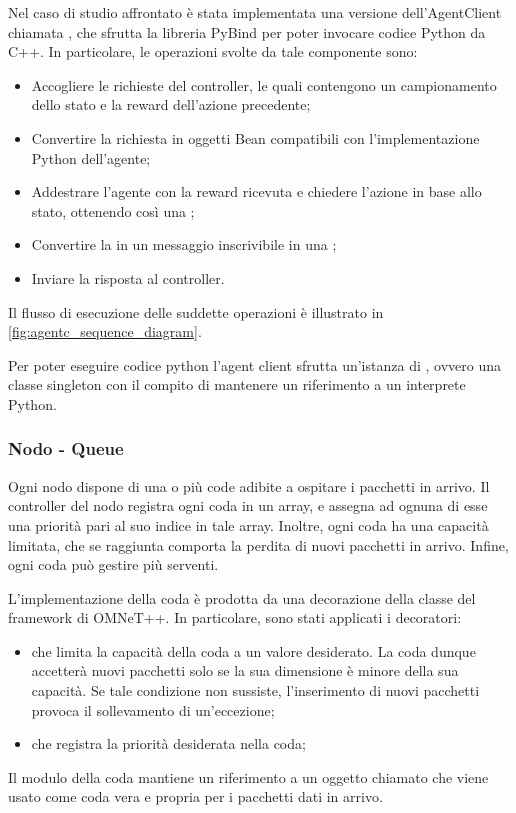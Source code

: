 \documentclass[conference]{IEEEtran}
\begin{document}
Nel caso di studio affrontato è stata implementata una versione dell'AgentClient chiamata
, che sfrutta la libreria PyBind per poter invocare codice
Python da C++. In particolare, le operazioni svolte da tale componente sono:
\begin{itemize}
    \item Accogliere le richieste del controller, le quali contengono un campionamento
    dello stato e la reward dell'azione precedente;
    \item Convertire la richiesta in oggetti Bean compatibili con l'implementazione Python
    dell'agente;
    \item Addestrare l'agente con la reward ricevuta e chiedere l'azione in base 
    allo stato, ottenendo così una ;
    \item Convertire la  in un messaggio inscrivibile 
    in una ;
    \item Inviare la risposta al controller.
\end{itemize}
Il flusso di esecuzione delle suddette operazioni è illustrato in \autoref{fig:agentc_sequence_diagram}.

Per poter eseguire codice python l'agent client sfrutta un'istanza di
, ovvero una classe singleton con il compito di mantenere un 
riferimento a un interprete Python.
 
\subsubsection{Nodo - Queue}
Ogni nodo dispone di una o più code adibite a ospitare i pacchetti in arrivo.
Il controller del nodo registra ogni coda in un array, e assegna ad ognuna di esse una
priorità pari al suo indice in tale array. Inoltre, ogni coda ha una capacità limitata,
che se raggiunta comporta la perdita di nuovi pacchetti in arrivo. Infine, ogni coda
può gestire più serventi.

L'implementazione della coda è prodotta da una decorazione della classe 
del framework di OMNeT++. In particolare, sono stati applicati i decoratori:
\begin{itemize}
    \item {} che limita la capacità della coda a un valore desiderato.
    La coda dunque accetterà nuovi pacchetti solo se la sua dimensione è minore della
    sua capacità. Se tale condizione non sussiste, l'inserimento di nuovi pacchetti
    provoca il sollevamento di un'eccezione;
    \item {} che registra la priorità desiderata nella coda;
\end{itemize}
Il modulo della coda mantiene un riferimento a un oggetto  chiamato
 che viene usato
come coda vera e propria per i pacchetti dati in arrivo.
\end{document}
